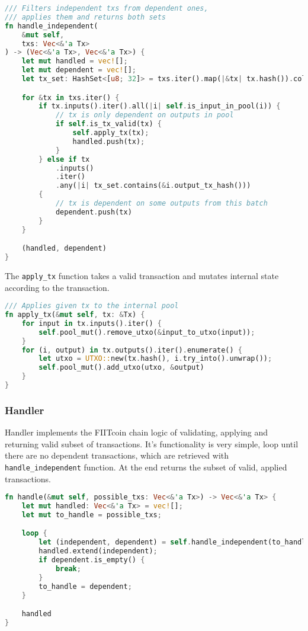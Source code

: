 \begin{lstlisting}[language=Rust, style=boxed, caption={handle\_independent}]
/// Filters independent txs from dependent ones,
/// applies them and returns both sets
fn handle_independent(
    &mut self,
    txs: Vec<&'a Tx>
) -> (Vec<&'a Tx>, Vec<&'a Tx>) {
    let mut handled = vec![];
    let mut dependent = vec![];
    let tx_set: HashSet<[u8; 32]> = txs.iter().map(|&tx| tx.hash()).collect();

    for &tx in txs.iter() {
        if tx.inputs().iter().all(|i| self.is_input_in_pool(i)) {
            // tx is only dependent on outputs in pool
            if self.is_tx_valid(tx) {
                self.apply_tx(tx);
                handled.push(tx);
            }
        } else if tx
            .inputs()
            .iter()
            .any(|i| tx_set.contains(&i.output_tx_hash()))
        {
            // tx is dependent on some outputs from this batch
            dependent.push(tx)
        }
    }

    (handled, dependent)
}
\end{lstlisting}

\pagebreak
The \texttt{apply\_tx} function takes a valid transaction and mutates internal
state according to the transaction.

\begin{lstlisting}[language=Rust, style=boxed, caption={apply\_tx}]
/// Applies given tx to the internal pool
fn apply_tx(&mut self, tx: &Tx) {
    for input in tx.inputs().iter() {
        self.pool_mut().remove_utxo(&input_to_utxo(input));
    }
    for (i, output) in tx.outputs().iter().enumerate() {
        let utxo = UTXO::new(tx.hash(), i.try_into().unwrap());
        self.pool_mut().add_utxo(utxo, &output)
    }
}
\end{lstlisting}

\subsubsection*{Handler}\label{handler}

Handler implements the FIITcoin chain logic of validating, applying and 
returning valid subset of transactions. It's functionality is very simple,
loop until there are no dependent transactions, which are retrieved with
\texttt{handle\_independent} function. At the end returns the subset of
valid, applied transactions.


\begin{lstlisting}[language=Rust, style=boxed, caption={Handler::handle}]
fn handle(&mut self, possible_txs: Vec<&'a Tx>) -> Vec<&'a Tx> {
    let mut handled: Vec<&'a Tx> = vec![];
    let mut to_handle = possible_txs;

    loop {
        let (independent, dependent) = self.handle_independent(to_handle);
        handled.extend(independent);
        if dependent.is_empty() {
            break;
        }
        to_handle = dependent;
    }

    handled
}
\end{lstlisting}


